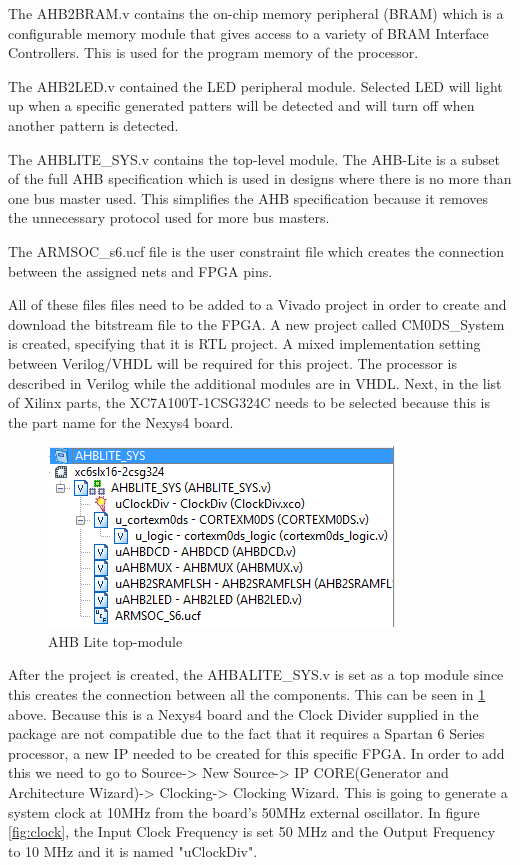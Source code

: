 The AHB2BRAM.v contains the on-chip memory peripheral (BRAM) 
which is a configurable memory module that gives access to a variety of BRAM Interface Controllers. This is used for the program memory of the processor.

The AHB2LED.v contained the LED peripheral module. Selected LED will light up when a specific generated patters will be detected and will turn off when another pattern is detected.

The AHBLITE\_SYS.v contains the top-level module. The AHB-Lite is a subset of the full AHB specification which is used in designs where there is no more than one bus master used. This simplifies the AHB specification because it removes the unnecessary protocol used for more bus masters.

The ARMSOC\_s6.ucf file is the user constraint file which creates the connection between the assigned nets and FPGA pins.

All of these files files need to be added to a Vivado project in order to create and download the bitstream file to the FPGA. A new project called CM0DS\_System is created, specifying that it is RTL project. A mixed implementation setting between Verilog/VHDL will be required for this project. The processor is described in Verilog while the additional modules are in VHDL. Next, in the list of Xilinx parts, the XC7A100T-1CSG324C needs to be selected because this is the part name for the Nexys4 board. 
\begin{figure}
\centering
\includegraphics[scale=0.7]{figures/AHBLITE_SYS_modules_ISE_schematic.PNG}
\caption{AHB Lite top-module } 
\label{fig:ahblite_sys}
\end{figure}

After the project is created, the AHBALITE\_SYS.v is set as a top module since this creates the connection between all the components. This can be seen in \ref{fig:ahblite_sys} above. Because this is a Nexys4 board and the Clock Divider supplied in the package are not compatible due to the fact that it requires a Spartan 6 Series processor, a new IP needed to be created for this specific FPGA. In order to add this we need to go to Source-> New Source-> IP CORE(Generator and Architecture Wizard)-> Clocking-> Clocking Wizard. This is going to generate a system clock at 10MHz from the board's 50MHz external oscillator. In figure \ref{fig:clock}, the Input Clock Frequency is set 50 MHz and the Output Frequency to 10 MHz and it is named "uClockDiv".

